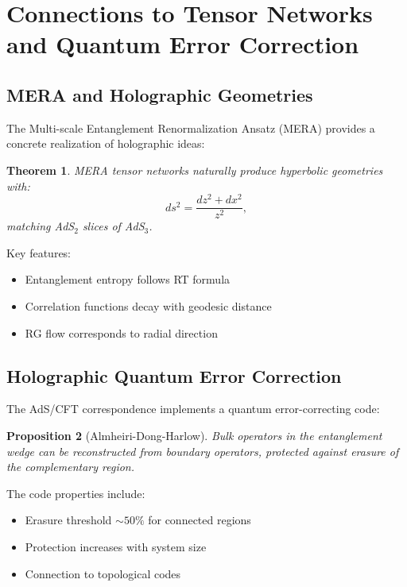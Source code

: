 \documentclass[11pt,letterpaper]{article}
\newtheorem{theorem}{Theorem}[section]
\newtheorem{proposition}[theorem]{Proposition}
\begin{document}
\section{Connections to Tensor Networks and Quantum Error Correction}

\subsection{MERA and Holographic Geometries}

The Multi-scale Entanglement Renormalization Ansatz (MERA) provides a concrete realization of holographic ideas:

\begin{theorem}
MERA tensor networks naturally produce hyperbolic geometries with:
\begin{equation}
ds^2 = \frac{dz^2 + dx^2}{z^2},
\end{equation}
matching AdS$_2$ slices of AdS$_3$.
\end{theorem}

Key features:
\begin{itemize}
\item Entanglement entropy follows RT formula
\item Correlation functions decay with geodesic distance
\item RG flow corresponds to radial direction
\end{itemize}

\subsection{Holographic Quantum Error Correction}

The AdS/CFT correspondence implements a quantum error-correcting code:

\begin{proposition}[Almheiri-Dong-Harlow]
Bulk operators in the entanglement wedge can be reconstructed from boundary operators, protected against erasure of the complementary region.
\end{proposition}

The code properties include:
\begin{itemize}
\item Erasure threshold $\sim 50\%$ for connected regions
\item Protection increases with system size
\item Connection to topological codes
\end{itemize}
\end{document}
